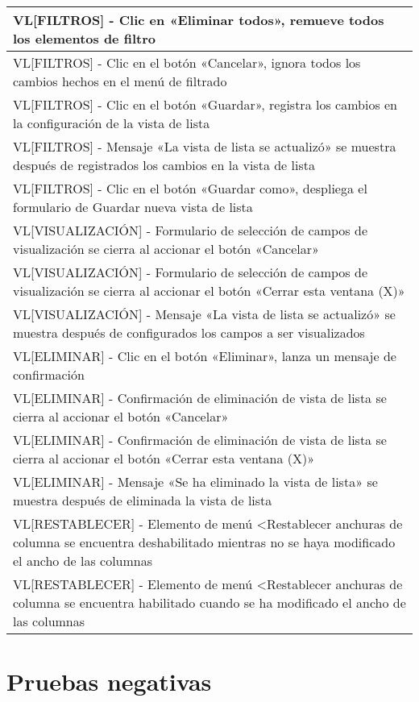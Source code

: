 \begin{longtable}{|p{15.0cm}|}
VL[FILTROS] - Clic en «Eliminar todos», remueve todos los elementos de filtro \\ \hline
VL[FILTROS] - Clic en el botón «Cancelar», ignora todos los cambios hechos en el menú de filtrado \\ \hline
VL[FILTROS] - Clic en el botón «Guardar», registra los cambios en la configuración de la vista de lista \\ \hline
VL[FILTROS] - Mensaje «La vista de lista se actualizó» se muestra después de registrados los cambios en la vista de lista \\ \hline
VL[FILTROS] - Clic en el botón «Guardar como», despliega el formulario de Guardar nueva vista de lista \\ \hline
VL[VISUALIZACIÓN] - Formulario de selección de campos de visualización se cierra al accionar el botón «Cancelar» \\ \hline
VL[VISUALIZACIÓN] - Formulario de selección de campos de visualización se cierra al accionar el botón «Cerrar esta ventana (X)» \\ \hline
VL[VISUALIZACIÓN] - Mensaje «La vista de lista se actualizó» se muestra después de configurados los campos a ser visualizados \\ \hline
VL[ELIMINAR] - Clic en el botón «Eliminar», lanza un mensaje de confirmación \\ \hline
VL[ELIMINAR] - Confirmación de eliminación de vista de lista se cierra al accionar el botón «Cancelar» \\ \hline
VL[ELIMINAR] - Confirmación de eliminación de vista de lista se cierra al accionar el botón «Cerrar esta ventana (X)» \\ \hline
VL[ELIMINAR] - Mensaje «Se ha eliminado la vista de lista» se muestra después de eliminada la vista de lista \\ \hline
VL[RESTABLECER] - Elemento de menú <Restablecer anchuras de columna se encuentra deshabilitado mientras no se haya modificado el ancho de las columnas \\ \hline
VL[RESTABLECER] - Elemento de menú <Restablecer anchuras de columna se encuentra habilitado cuando se ha modificado el ancho de las columnas \\ \hline
\end{longtable}

\section{Pruebas negativas}

